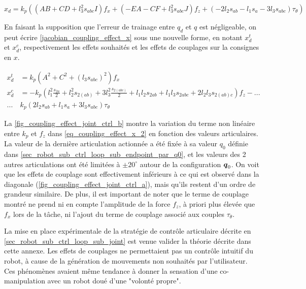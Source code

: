 \begin{appendices}
	\begin{equation}  \label{jacobian_coupling_effect_x}
		x_d = k_p \left(
		(A B + C D + l_3^2 s_{abc} I) f_x +
		(-E A - C F + l_3^2 s_{abc} J) f_z + 
		(-2 l_2 s_{ab} - l_1 s_{a} - 3 l_3 s_{abc}) \tau_\theta \right)	
	\end{equation}
	
	En faisant la supposition que l'erreur de trainage entre $ q_d $ et $ q $ est négligeable, on peut écrire \cref{jacobian_coupling_effect_x} sous une nouvelle forme, en notant $ x_d^t $ et $ x_d^c $, respectivement les effets souhaités et les effets de couplages sur la consignes en $ x $.
	
	\begin{equation} \label{eq_coupling_effect_x_2}
		\begin{split}
			x_d^t &= k_p (A^2 + C^2 + (l_3 s_{abc})^2) f_x \\
			x_d^c &= -k_p \left( l_1^2 \frac{s_{2a}}{2} + l_2^2 s_{2(ab)} + 3 l_3^2  \frac{s_{2(abc)}}{2} + l_1 l_2 s_{2ab} + l_1 l_3 s_{2abc} + 2 l_2 l_3 s_{2(ab)c} \right) f_z - ...\\
			... \  & k_p \left(2 l_2 s_{ab} + l_1 s_{a} + 3 l_3 s_{abc} \right) \tau_\theta
		\end{split}		
	\end{equation}
	
	La \cref{fig_coupling_effect_joint_ctrl_b} 
	montre la variation du terme non linéaire entre $ k_p $ et $ f_z $ dans \cref{eq_coupling_effect_x_2} en fonction des valeurs articulaires.  La valeur de la dernière articulation actionnée a été fixée à sa valeur $ q_0 $ définie dans \cref{sec_robot_sub_ctrl_loop_sub_endpoint_par_q0}, et les valeurs des 2 autres articulations ont été limitées à $ \pm20^\circ $ autour de la configuration $ \vect{q}_0 $. On voit que les effets de couplage sont effectivement inférieurs à ce qui est observé dans la diagonale (\cref{fig_coupling_effect_joint_ctrl_a}), mais qu'ils restent d'un ordre de grandeur similaire. De plus, il est important de noter que le terme de couplage montré ne prend ni en compte l'amplitude de la force $ f_z $, à priori plus élevée que $ f_x $ lors de la tâche, ni l'ajout du terme de couplage associé aux couples $ \tau_\theta $. 
	
	\newlineBlank
	La mise en place expérimentale de la stratégie de contrôle articulaire décrite en \cref{sec_robot_sub_ctrl_loop_sub_joint} est venue valider la théorie décrite dans cette annexe. Les effets de couplages ne permettaient pas un contrôle intuitif du robot, à cause de la génération de mouvements non souhaités par l'utilisateur. Ces phénomènes avaient même tendance à donner la sensation d'une co-manipulation avec un robot doué d'une "volonté propre".
	

\end{appendices}
